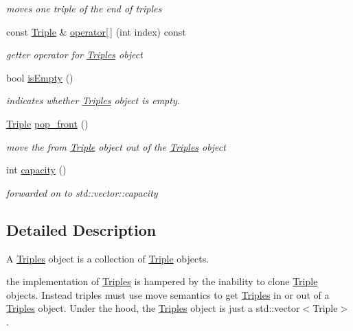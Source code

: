 \begin{DoxyCompactItemize}
\begin{DoxyCompactList}\small\item\em moves one triple of the end of triples \end{DoxyCompactList}\item 
const \hyperlink{classomexmeta_1_1Triple}{Triple} \& \hyperlink{classomexmeta_1_1Triples_a43d540423a436986d9f72d7cf0f02d72}{operator\mbox{[}$\,$\mbox{]}} (int index) const
\begin{DoxyCompactList}\small\item\em getter operator for \hyperlink{classomexmeta_1_1Triples}{Triples} object \end{DoxyCompactList}\item 
bool \hyperlink{classomexmeta_1_1Triples_a48ab93d0e38e3cfcb4eac9264b047f0a}{is\+Empty} ()
\begin{DoxyCompactList}\small\item\em indicates whether \hyperlink{classomexmeta_1_1Triples}{Triples} object is empty. \end{DoxyCompactList}\item 
\hyperlink{classomexmeta_1_1Triple}{Triple} \hyperlink{classomexmeta_1_1Triples_abb333b83c7a8ed1f210816ef88c8d3a0}{pop\+\_\+front} ()
\begin{DoxyCompactList}\small\item\em move the from \hyperlink{classomexmeta_1_1Triple}{Triple} object out of the \hyperlink{classomexmeta_1_1Triples}{Triples} object \end{DoxyCompactList}\item 
int \hyperlink{classomexmeta_1_1Triples_a1f7ba9d5cd575ba5c63ed9dbbd1f279c}{capacity} ()
\begin{DoxyCompactList}\small\item\em forwarded on to std\+::vector\+::capacity \end{DoxyCompactList}\end{DoxyCompactItemize}


\subsection{Detailed Description}
A \hyperlink{classomexmeta_1_1Triples}{Triples} object is a collection of \hyperlink{classomexmeta_1_1Triple}{Triple} objects. 

the implementation of \hyperlink{classomexmeta_1_1Triples}{Triples} is hampered by the inability to clone \hyperlink{classomexmeta_1_1Triple}{Triple} objects. Instead triples must use move semantics to get \hyperlink{classomexmeta_1_1Triples}{Triples} in or out of a \hyperlink{classomexmeta_1_1Triples}{Triples} object. Under the hood, the \hyperlink{classomexmeta_1_1Triples}{Triples} object is just a std\+::vector$<$\+Triple$>$. 

